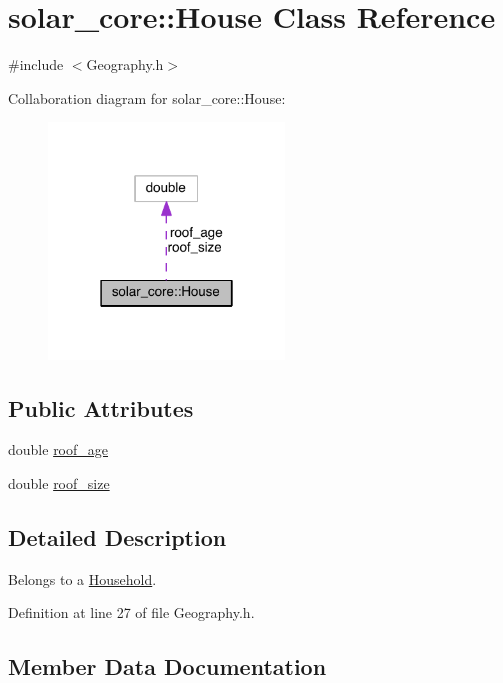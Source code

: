 \hypertarget{classsolar__core_1_1_house}{}\section{solar\+\_\+core\+:\+:House Class Reference}
\label{classsolar__core_1_1_house}


{\ttfamily \#include $<$Geography.\+h$>$}



Collaboration diagram for solar\+\_\+core\+:\+:House\+:\nopagebreak
\begin{figure}[H]
\begin{center}
\leavevmode
\includegraphics[width=178pt]{classsolar__core_1_1_house__coll__graph}
\end{center}
\end{figure}
\subsection*{Public Attributes}
\begin{DoxyCompactItemize}
\item 
double \hyperlink{classsolar__core_1_1_house_aa6491ce4f3fc6d99a59ea80cfb8194fc}{roof\+\_\+age}
\item 
double \hyperlink{classsolar__core_1_1_house_a7f872cb768b83e70e263590078fa4c7d}{roof\+\_\+size}
\end{DoxyCompactItemize}


\subsection{Detailed Description}
Belongs to a \hyperlink{classsolar__core_1_1_household}{Household}. 

Definition at line 27 of file Geography.\+h.



\subsection{Member Data Documentation}
\hypertarget{classsolar__core_1_1_house_aa6491ce4f3fc6d99a59ea80cfb8194fc}{}
